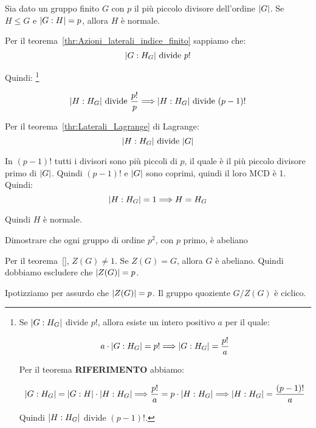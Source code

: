 \begin{esercizio}
	Sia dato un gruppo finito $G$ con $p$ il più piccolo divisore dell'ordine $\lvert G \rvert$.
	Se $H \le G$ e $\lvert G:H \rvert = p$, allora $H$ è normale.
\end{esercizio}
\begin{soluzione}
	Per il teorema~\ref{thr:Azioni_laterali_indice_finito} sappiamo che:
	\begin{equation*}
		\lvert G:H_G \rvert \text{ divide } p!
	\end{equation*}

	Quindi:
	\footnote{
		Se $\lvert G:H_G \rvert$ divide $p!$, allora esiste un intero positivo $a$ per il quale:
		
		\begin{equation}
			a \cdot \lvert G:H_G \rvert = p! \Longrightarrow \lvert G:H_G \rvert = \dfrac{p!}{a}
		\end{equation} 
	
		Per il teorema \textbf{RIFERIMENTO} abbiamo:
		
		\begin{equation}
			\lvert G:H_G \rvert = \lvert G:H \rvert \cdot \lvert H:H_G \rvert \Longrightarrow
			\dfrac{p!}{a} = p \cdot \lvert H:H_G \rvert \Longrightarrow
			\lvert H:H_G \rvert = \dfrac{(p-1)!}{a}
		\end{equation}
	
		Quindi $\lvert H:H_G \rvert$ divide $(p-1)!$.
	}
	
	\begin{equation*}
		\lvert H:H_G \rvert \text{ divide } \dfrac{p!}{p} \Longrightarrow \lvert H:H_G \rvert \text{ divide } (p-1)!
	\end{equation*}

	Per il teorema~\ref{thr:Laterali_Lagrange} di Lagrange:
	\begin{equation*}
		\lvert H:H_G \rvert \text{ divide } \lvert G \rvert
	\end{equation*}

	In $(p-1)!$ tutti i divisori sono più piccoli di $p$, il quale è il più piccolo divisore primo di $\lvert G \rvert$.
	Quindi $(p-1)!$ e $\lvert G \rvert$ sono coprimi, quindi il loro MCD è 1.
	Quindi:
	\begin{equation*}
		\lvert H:H_G \rvert = 1 \Longrightarrow H = H_G
	\end{equation*}

	Quindi $H$ è normale.

\end{soluzione}

\begin{esercizio}
	Dimostrare che ogni gruppo di ordine $p^2$, con $p$ primo, è abeliano
\end{esercizio}
\begin{dimostrazione}
	Per il teorema~\ref{}, $Z(G) \ne 1$.
	Se $Z(G) = G$, allora $G$ è abeliano.
	Quindi dobbiamo escludere che $\lvert Z(G) \rvert = p$.

	Ipotizziamo per assurdo che $\lvert Z(G) \rvert = p$.
	Il gruppo quoziente $G/Z(G)$ è ciclico.
\end{dimostrazione}

